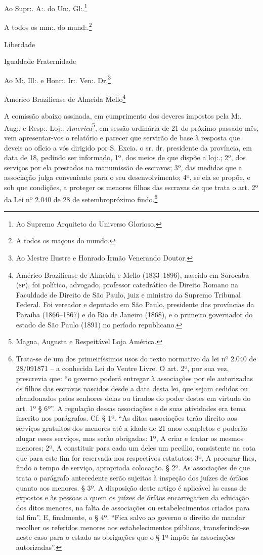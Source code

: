 Ao Supr:. A:. do Un:. Gl:.\footnote{ Ao Supremo Arquiteto do Universo
  Glorioso.}

A todos os mm:. do mund:.\footnote{ A todos os maçons do mundo.}

Liberdade

Igualdade Fraternidade

Ao M:. Ill:. e Honr:. Ir:. Ven:. Dr.\footnote{ Ao Mestre Ilustre e
  Honrado Irmão Venerando Doutor.}

Americo Braziliense de Almeida Mello\footnote{ Américo Braziliense de
  Almeida e Mello (1833--1896), nascido em Sorocaba (\textsc{sp}), foi político,
  advogado, professor catedrático de Direito Romano na Faculdade de
  Direito de São Paulo, juiz e ministro da Supremo Tribunal Federal. Foi
  vereador e deputado em São Paulo, presidente das províncias da Paraíba
  (1866--1867) e do Rio de Janeiro (1868), e o primeiro governador do
  estado de São Paulo (1891) no período republicano.}

A comissão abaixo assinada, em cumprimento dos deveres impostos pela M:.
Aug:. e Resp:. Loj:. \emph{America}\footnote{ Magna, Augusta e
  Respeitável Loja América.}, em sessão ordinária de 21 do próximo
passado mês, vem apresentar-vos o relatório e parecer que servirão de
base à resposta que deveis ao ofício a vós dirigido por S. Excia. o sr.
dr. presidente da província, em data de 18, pedindo ser informado, 1º,
dos meios de que dispõe a loj:.; 2º, dos serviços por ela prestados na
manumissão de escravos; 3º, das medidas que a associação julga
conveniente para o seu desenvolvimento; 4º, se ela se propõe, e sob que
condições, a proteger os menores filhos das escravas de que trata o art.
2º da Lei nº 2.040 de 28 de setembropróximo findo.\footnote{ Trata-se
  de um dos primeiríssimos usos do texto normativo da lei nº 2.040 de
  28/091871 -- a conhecida Lei do Ventre Livre. O art. 2º, por sua vez,
  prescrevia que: ``o governo poderá entregar à associações por ele
  autorizadas os filhos das escravas nascidos desde a data desta lei,
  que sejam cedidos ou abandonados pelos senhores delas ou tirados do
  poder destes em virtude do art. 1º § 6º''. A regulação dessas
  associações e de suas atividades era tema inscrito nos parágrafos. Cf.
  § 1º. ``As ditas associações terão direito aos serviços gratuitos dos
  menores até a idade de 21 anos completos e poderão alugar esses
  serviços, mas serão obrigadas: 1º, A criar e tratar os mesmos menores;
  2º, A constituir para cada um deles um pecúlio, consistente na cota
  que para este fim for reservada nos respectivos estatutos; 3º, A
  procurar-lhes, findo o tempo de serviço, apropriada colocação. § 2º.
  As associações de que trata o parágrafo antecedente serão sujeitas à
  inspeção dos juízes de órfãos quanto aos menores. § 3º. A disposição
  deste artigo é aplicável às casas de expostos e às pessoas a quem os
  juízes de órfãos encarregarem da educação dos ditos menores, na falta
  de associações ou estabelecimentos criados para tal fim''. E,
  finalmente, o § 4º. ``Fica salvo ao governo o direito de mandar
  recolher os referidos menores aos estabelecimentos públicos,
  transferindo-se neste caso para o estado as obrigações que o § 1º
  impõe às associações autorizadas''.}

